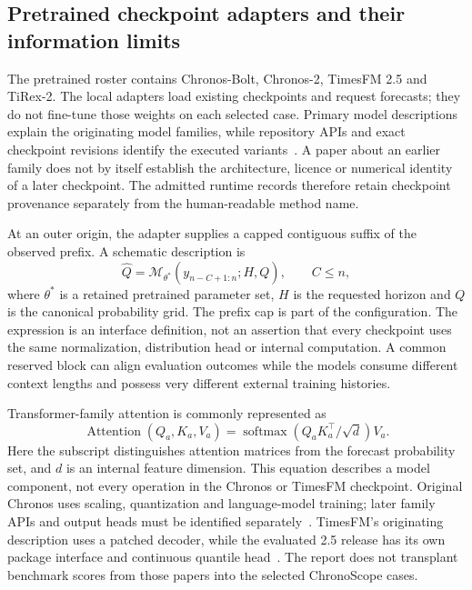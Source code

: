 \subsection{Pretrained checkpoint adapters and their information limits}
\label{sec:method-pretrained}
The pretrained roster contains Chronos-Bolt, Chronos-2, TimesFM 2.5 and TiRex-2. The local adapters load existing checkpoints and request forecasts; they do not fine-tune those weights on each selected case. Primary model descriptions explain the originating model families, while repository APIs and exact checkpoint revisions identify the executed variants~\cite{chronospaper,chronos,timesfmpaper,timesfm,tirex}. A paper about an earlier family does not by itself establish the architecture, licence or numerical identity of a later checkpoint. The admitted runtime records therefore retain checkpoint provenance separately from the human-readable method name.

At an outer origin, the adapter supplies a capped contiguous suffix of the observed prefix. A schematic description is
\begin{equation}\label{eq:report-checkpoint-map}
\widehat Q=\mathcal M_{\theta^*}(y_{n-C+1:n};H,Q),\qquad C\le n,
\end{equation}
where $\theta^*$ is a retained pretrained parameter set, $H$ is the requested horizon and $Q$ is the canonical probability grid. The prefix cap is part of the configuration. The expression is an interface definition, not an assertion that every checkpoint uses the same normalization, distribution head or internal computation. A common reserved block can align evaluation outcomes while the models consume different context lengths and possess very different external training histories.

Transformer-family attention is commonly represented as
\begin{equation}\label{eq:report-attention}
\operatorname{Attention}(Q_a,K_a,V_a)=\operatorname{softmax}(Q_aK_a^\top/\sqrt d)V_a.
\end{equation}
Here the subscript distinguishes attention matrices from the forecast probability set, and $d$ is an internal feature dimension. This equation describes a model component, not every operation in the Chronos or TimesFM checkpoint. Original Chronos uses scaling, quantization and language-model training; later family APIs and output heads must be identified separately~\cite{chronospaper,chronos}. TimesFM's originating description uses a patched decoder, while the evaluated 2.5 release has its own package interface and continuous quantile head~\cite{timesfmpaper,timesfm}. The report does not transplant benchmark scores from those papers into the selected ChronoScope cases.

